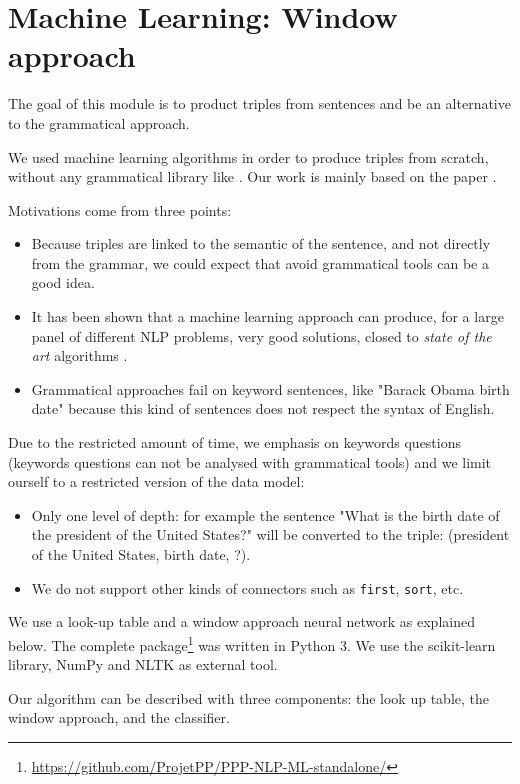 \section{Machine Learning: Window approach}
\label{mlwindow}

The goal of this module is to product triples from sentences and be an alternative to the grammatical approach.

We used machine learning algorithms in order to produce triples from scratch, without any grammatical library like \Stanford. Our work is mainly based on the paper \cite{collobert}.

Motivations come from three points:
\begin{itemize}
\item Because triples are linked to the semantic of the sentence, and not directly from the grammar, we could expect that avoid grammatical tools can be a good idea.
\item It has been shown that a machine learning approach can produce, for a large panel of different NLP problems, very good solutions, closed to \textit{state of the art} algorithms \cite{collobert}.
\item Grammatical approaches fail on keyword sentences, like "Barack Obama birth date" because this kind of sentences does not respect the syntax of English.
\end{itemize}

Due to the restricted amount of time, we emphasis on keywords questions (keywords questions can not be analysed with grammatical tools) and we limit ourself to a restricted version of the data model:
\begin{itemize}
\item Only one level of depth: for example the sentence "What is the birth date of the president of the United States?" will be converted to the triple: (president of the United States, birth date, ?).
\item We do not support other kinds of connectors such as \texttt{first}, \texttt{sort}, etc.
\end{itemize}

We use a look-up table and a window approach neural network as explained below. The complete package\footnote{\url{https://github.com/ProjetPP/PPP-NLP-ML-standalone/}} was written in Python 3. We use the scikit-learn library, NumPy and NLTK as external tool.

Our algorithm can be described with three components: the look up table, the window approach, and the classifier.

